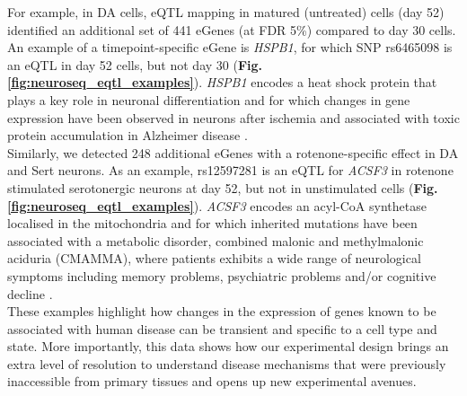 For example, in DA cells, eQTL mapping in matured (untreated) cells (day 52) identified an additional set of 441 eGenes (at FDR 5\%) compared to day 30 cells.
An example of a timepoint-specific eGene is \textit{HSPB1}, for which SNP rs6465098 is an eQTL in day 52 cells, but not day 30 (\textbf{Fig. \ref{fig:neuroseq_eqtl_examples}}). 
\textit{HSPB1} encodes a heat shock protein that plays a key role in neuronal differentiation \cite{miller2018heat} and for which changes in gene expression have been observed in neurons after ischemia \cite{bartelt2016hspb5} and associated with toxic protein accumulation in Alzheimer disease \cite{shimura2004binding, wilhelmus2006small}.\\

Similarly, we detected 248 additional eGenes with a rotenone-specific effect in DA and Sert neurons. 
As an example, rs12597281 is an eQTL for \textit{ACSF3} in rotenone stimulated serotonergic neurons at day 52, but not in unstimulated cells (\textbf{Fig. \ref{fig:neuroseq_eqtl_examples}}). 
\textit{ACSF3} encodes an acyl-CoA synthetase localised in the mitochondria and for which inherited mutations have been associated with a metabolic disorder, combined malonic and methylmalonic aciduria (CMAMMA), where patients exhibits a wide range of neurological symptoms including memory problems, psychiatric problems and/or cognitive decline \cite{tucci2020brain}.\\

These examples highlight how changes in the expression of genes known to be associated with human disease can be transient and specific to a cell type and state. 
More importantly, this data shows how our experimental design brings an extra level of resolution to understand disease mechanisms that were previously inaccessible from primary tissues and opens up new experimental avenues. \\



